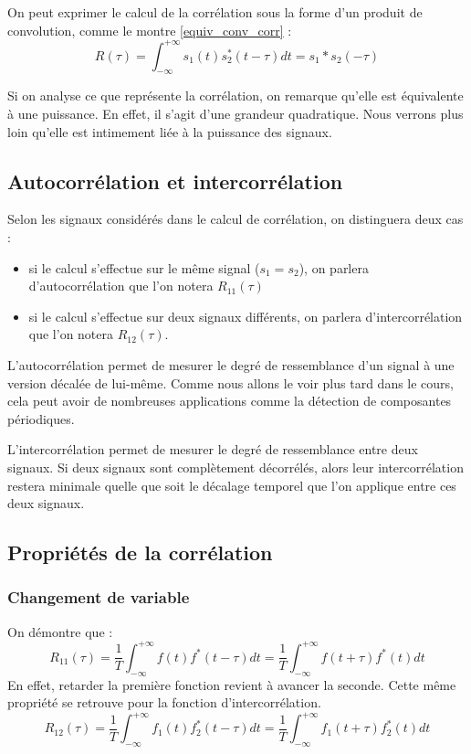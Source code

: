 	On peut exprimer le calcul de la corrélation sous la forme d'un produit de convolution, comme le montre \ref{equiv_conv_corr} :
	\begin{equation}\label{equiv_conv_corr}
	R(\tau)=\int_{-\infty}^{+\infty}s_{1}(t)s_{2}^{*}(t-\tau)dt=s_{1}*s_{2}(-\tau)
	\end{equation}

	
	Si on analyse ce que représente la corrélation, on remarque qu'elle est équivalente à une puissance. En effet, il s'agit d'une grandeur quadratique. Nous verrons plus loin qu'elle est intimement liée à la puissance des signaux.
	
	
	\subsection{Autocorrélation et intercorrélation}
	
	Selon les signaux considérés dans le calcul de corrélation, on distinguera deux cas :
	\begin{itemize}
		\item si le calcul s'effectue sur le même signal ($s_{1} = s_{2}$), on parlera d'autocorrélation que l'on notera $R_{11}(\tau)$
		\item si le calcul s'effectue sur deux signaux différents, on parlera d'intercorrélation que l'on notera $R_{12}(\tau)$.
	\end{itemize}

	L'autocorrélation permet de mesurer le degré de ressemblance d'un signal à une version décalée de lui-même. Comme nous allons le voir plus tard dans le cours, cela peut avoir de nombreuses applications comme la détection de composantes périodiques.
	
	L'intercorrélation permet de mesurer le degré de ressemblance entre deux signaux. Si deux signaux sont complètement décorrélés, alors leur intercorrélation restera minimale quelle que soit le décalage temporel que l'on applique entre ces deux signaux.
	
	
	\subsection{Propriétés de la corrélation}
	
	\subsubsection{Changement de variable}
	
	On démontre que :
	\begin{equation}\label{key}
	R_{11}(\tau)=\frac{1}{T}\int_{-\infty}^{+\infty}f(t)f^{*}(t-\tau)dt=\frac{1}{T}\int_{-\infty}^{+\infty}f(t+\tau)f^{*}(t)dt
	\end{equation}
	En effet, retarder la première fonction revient à avancer la seconde. Cette même propriété se retrouve pour la fonction d'intercorrélation.
	\begin{equation}\label{key}
	R_{12}(\tau)=\frac{1}{T}\int_{-\infty}^{+\infty}f_{1}(t)f^{*}_{2}(t-\tau)dt=\frac{1}{T}\int_{-\infty}^{+\infty}f_{1}(t+\tau)f^{*}_{2}(t)dt
	\end{equation}
	
